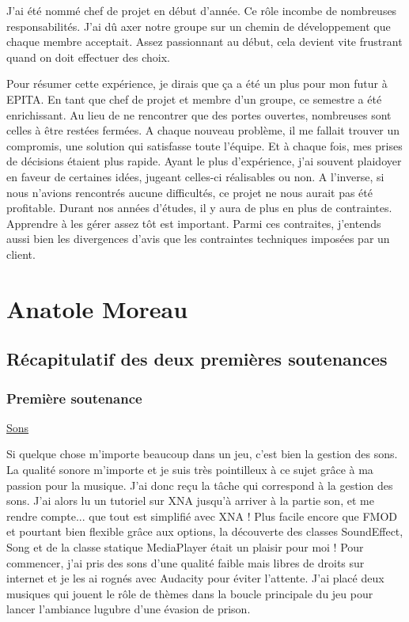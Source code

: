 \documentclass[12pt]{article}
\begin{document}
J'ai été nommé chef de projet en début d'année. Ce rôle incombe de nombreuses responsabilités. J'ai dû axer notre groupe sur un chemin de développement que chaque membre acceptait. Assez passionnant au début, cela devient vite frustrant quand on doit effectuer des choix. 

Pour résumer cette expérience, je dirais que ça a été un plus pour mon futur à EPITA. En tant que chef de projet et membre d'un groupe, ce semestre a été enrichissant. Au lieu de ne rencontrer que des portes ouvertes, nombreuses sont celles à être restées fermées. A chaque nouveau problème, il me fallait trouver un compromis, une solution qui satisfasse toute l'équipe. Et à chaque fois, mes prises de décisions étaient plus rapide. Ayant le plus d'expérience, j'ai souvent plaidoyer en faveur de certaines idées, jugeant celles-ci réalisables ou non. A l'inverse, si nous n'avions rencontrés aucune difficultés, ce projet ne nous aurait pas été profitable. Durant nos années d'études, il y aura de plus en plus de contraintes. Apprendre à les gérer assez tôt est important. Parmi ces contraites, j'entends aussi bien les divergences d'avis que les contraintes techniques imposées par un client. 

\newpage

\section {Anatole Moreau}

\subsection{Récapitulatif des deux premières soutenances}
\subsubsection {Première soutenance}
\underline {Sons}
\par
Si quelque chose m'importe beaucoup dans un jeu, c'est bien la gestion des sons. La qualité sonore m'importe et je suis très pointilleux à ce sujet grâce à ma passion pour la musique. J'ai donc reçu la tâche qui correspond à la gestion des sons. J'ai alors lu un tutoriel sur XNA jusqu’à arriver à la partie son, et me rendre compte... que tout est simplifié avec XNA ! Plus facile encore que FMOD et pourtant bien flexible grâce aux options, la découverte des classes SoundEffect, Song et de la classe statique MediaPlayer était un plaisir pour moi ! Pour commencer, j'ai pris des sons d'une qualité faible mais libres de droits sur internet et je les ai rognés avec Audacity pour éviter l'attente. J'ai placé deux musiques qui jouent le rôle de thèmes dans la boucle principale du jeu pour lancer l'ambiance lugubre d'une évasion de prison.
\end{document}

